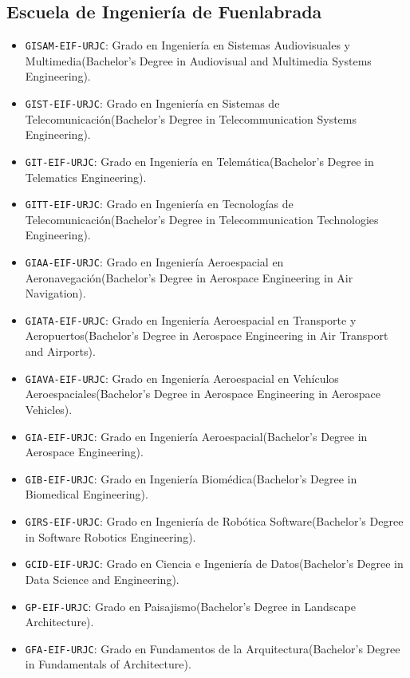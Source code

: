 \subsection {Escuela de Ingeniería de Fuenlabrada}
\begin {itemize}
\item \texttt {GISAM-EIF-URJC}: Grado en Ingeniería en Sistemas Audiovisuales y Multimedia\nobreakspace {}(Bachelor's Degree in Audiovisual and Multimedia Systems Engineering).
\item \texttt {GIST-EIF-URJC}: Grado en Ingeniería en Sistemas de Telecomunicación\nobreakspace {}(Bachelor's Degree in Telecommunication Systems Engineering).
\item \texttt {GIT-EIF-URJC}: Grado en Ingeniería en Telemática\nobreakspace {}(Bachelor's Degree in Telematics Engineering).
\item \texttt {GITT-EIF-URJC}: Grado en Ingeniería en Tecnologías de Telecomunicación\nobreakspace {}(Bachelor's Degree in Telecommunication Technologies Engineering).
\item \texttt {GIAA-EIF-URJC}: Grado en Ingeniería Aeroespacial en Aeronavegación\nobreakspace {}(Bachelor's Degree in Aerospace Engineering in Air Navigation).
\item \texttt {GIATA-EIF-URJC}: Grado en Ingeniería Aeroespacial en Transporte y Aeropuertos\nobreakspace {}(Bachelor's Degree in Aerospace Engineering in Air Transport and Airports).
\item \texttt {GIAVA-EIF-URJC}: Grado en Ingeniería Aeroespacial en Vehículos Aeroespaciales\nobreakspace {}(Bachelor's Degree in Aerospace Engineering in Aerospace Vehicles).
\item \texttt {GIA-EIF-URJC}: Grado en Ingeniería Aeroespacial\nobreakspace {}(Bachelor's Degree in Aerospace Engineering).
\item \texttt {GIB-EIF-URJC}: Grado en Ingeniería Biomédica\nobreakspace {}(Bachelor's Degree in Biomedical Engineering).
\item \texttt {GIRS-EIF-URJC}: Grado en Ingeniería de Robótica Software\nobreakspace {}(Bachelor's Degree in Software Robotics Engineering).
\item \texttt {GCID-EIF-URJC}: Grado en Ciencia e Ingeniería de Datos\nobreakspace {}(Bachelor's Degree in Data Science and Engineering).
\item \texttt {GP-EIF-URJC}: Grado en Paisajismo\nobreakspace {}(Bachelor's Degree in Landscape Architecture).
\item \texttt {GFA-EIF-URJC}: Grado en Fundamentos de la Arquitectura\nobreakspace {}(Bachelor's Degree in Fundamentals of Architecture).
\end {itemize}
